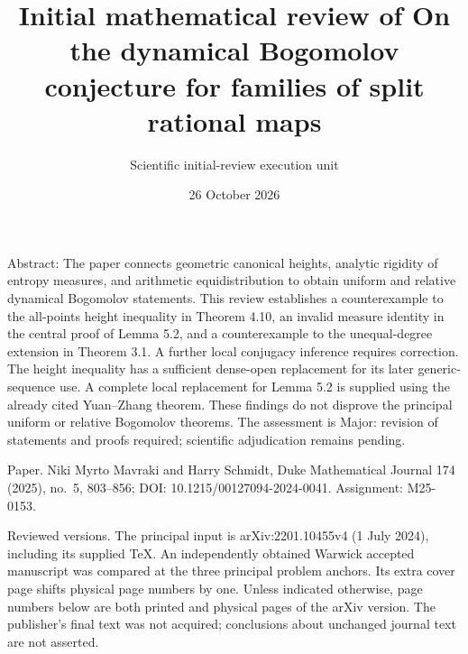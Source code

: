 \documentclass[10pt]{article}
\title{Initial mathematical review of
On the dynamical Bogomolov conjecture
for families of split rational maps}
\author{Scientific initial-review execution unit}
\date{26 October 2026}
\begin{document}
\maketitle
Abstract: The paper connects geometric canonical heights, analytic rigidity of entropy measures, and arithmetic equidistribution to obtain uniform and relative dynamical Bogomolov statements. This review establishes a counterexample to the all-points height inequality in Theorem 4.10, an invalid measure identity in the central proof of Lemma 5.2, and a counterexample to the unequal-degree extension in Theorem 3.1. A further local conjugacy inference requires correction. The height inequality has a sufficient dense-open replacement for its later generic-sequence use. A complete local replacement for Lemma 5.2 is supplied using the already cited Yuan–Zhang theorem. These findings do not disprove the principal uniform or relative Bogomolov theorems. The assessment is Major: revision of statements and proofs required; scientific adjudication remains pending.\par
Paper. Niki Myrto Mavraki and Harry Schmidt, Duke Mathematical Journal 174 (2025), no. 5, 803–856; DOI: 10.1215/00127094-2024-0041. Assignment: M25-0153.\par
Reviewed versions. The principal input is arXiv:2201.10455v4 (1 July 2024), including its supplied TeX. An independently obtained Warwick accepted manuscript was compared at the three principal problem anchors. Its extra cover page shifts physical page numbers by one. Unless indicated otherwise, page numbers below are both printed and physical pages of the arXiv version. The publisher’s final text was not acquired; conclusions about unchanged journal text are not asserted.\par
\end{document}
